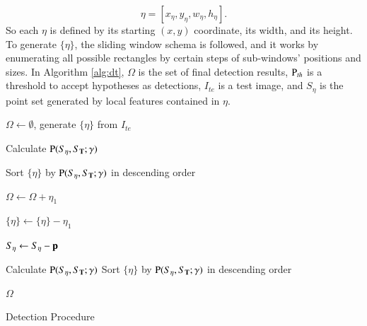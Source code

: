 \documentclass[paper]{ieice}
\begin{document}
\[\eta=[x_{\eta},y_{\eta},w_{\eta},h_{\eta}].\] So each $\eta$ is defined by its starting $(x,y)$ coordinate, its width, and its height. To generate $\{\eta \}$, the sliding window schema is followed, and it works by enumerating all possible rectangles by certain steps of sub-windows' positions and sizes. In Algorithm \ref{alg:dt}, ${\Omega }$ is the set of final detection results, ${\rm P}_{th}$ is a threshold to accept hypotheses as detections, $I_{te}$ is a test image, and $S_{\eta}$ is the point set generated by local features contained in ${\eta}$.


\begin{algorithm}[chapter]






    \begin{algorithmic}[1]


       \STATE ${\Omega }  \leftarrow \emptyset$, generate $\{\eta \}$ from $I_{te}$

        \FOR{$ \eta \in \{\eta \}$}

     \STATE  Calculate ${\rm P}(S_{\eta},S_{\bf{T}};\gamma)$

        \ENDFOR


    \STATE Sort $\{\eta \}$ by ${\rm P}(S_{\eta},S_{\bf{T}};\gamma)$ in descending order

     \STATE  ${\Omega }  \leftarrow  {\Omega } + \eta_1$

       \STATE  $\{ \eta \}  \leftarrow  \{ \eta \} - \eta_1$

       \FOR {$\eta \in \{\eta \}$}


        \STATE  $S_{\eta} \leftarrow S_{\eta} - \bf{p} $

       \ENDIF
         \ENDFOR
       \ENDFOR
       \STATE  Calculate ${\rm P}(S_{\eta},S_{\bf{T}};\gamma)$
       \ENDFOR
        \STATE Sort $\{\eta \}$ by ${\rm P}(S_{\eta},S_{\bf{T}};\gamma)$ in descending order
    \ENDWHILE

    \RETURN ${\Omega } $


    \end{algorithmic}

    \caption{Detection Procedure}
    \label{alg:dt}

\end{algorithm}
\end{document}
